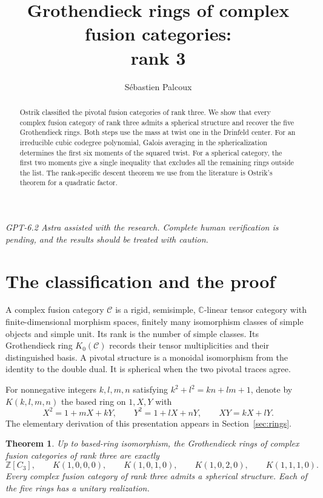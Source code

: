 \documentclass[11pt,a4paper]{article}
\title{Grothendieck rings of complex fusion categories:\\ rank 3}
\author{Sébastien Palcoux}
\date{}
\newtheorem{theorem}{Theorem}[section]
\theoremstyle{definition}
\theoremstyle{remark}
\newcommand{\C}{\mathbb C}
\newcommand{\Z}{\mathbb Z}
\newcommand{\cC}{\mathcal C}
\numberwithin{equation}{section}
\begin{document}
\raggedbottom
\maketitle
\begin{abstract}
Ostrik classified the pivotal fusion categories of rank three. We show
that every complex fusion category of rank three admits a spherical
structure and recover the five Grothendieck rings. Both steps use the
mass at twist one in the Drinfeld center. For an irreducible cubic
codegree polynomial, Galois averaging in the sphericalization determines
the first six moments of the squared twist. For a spherical category, the
first two moments give a single inequality that excludes all the
remaining rings outside the list. The rank-specific descent theorem
we use from the literature is Ostrik's theorem for a quadratic factor.
\end{abstract}
\par\smallskip
\begin{center}\begin{minipage}{0.88\linewidth}\small\itshape
GPT-6.2 Astra assisted with the research. Complete human verification is
pending, and the results should be treated with caution.
\end{minipage}\end{center}

\section{The classification and the proof}

A complex fusion category $\cC$ is a rigid, semisimple, $\C$-linear tensor
category with finite-dimensional morphism spaces, finitely many
isomorphism classes of simple objects and simple unit. Its rank is the
number of simple classes. Its Grothendieck ring $K_0(\cC)$ records their tensor
multiplicities and their distinguished basis. A pivotal structure is
a monoidal isomorphism from the identity to the double dual. It is
spherical when the two pivotal traces agree.

For nonnegative integers $k,l,m,n$ satisfying
$k^2+l^2=kn+lm+1$, denote by $K(k,l,m,n)$ the based ring on
$1,X,Y$ with
\[
 X^2=1+mX+kY,\qquad Y^2=1+lX+nY,\qquad XY=kX+lY.
\]
The elementary derivation of this presentation appears in
Section~\ref{sec:rings}.

\begin{theorem}\label{thm:main}
Up to based-ring isomorphism, the Grothendieck rings of complex fusion
categories of rank three are exactly
\[
 \Z[C_3],\qquad K(1,0,0,0),\qquad K(1,0,1,0),\qquad
 K(1,0,2,0),\qquad K(1,1,1,0).
\]
Every complex fusion category of rank three admits a spherical
structure. Each of the five rings has a unitary realization.
\end{theorem}
\end{document}
